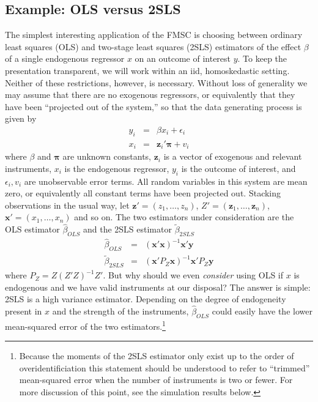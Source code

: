\documentclass[12pt]{article}
\theoremstyle{definition}
\begin{document}
\subsection{Example: OLS versus 2SLS}
\label{sec:OLSvsIVlowlevel}
The simplest interesting application of the FMSC is choosing between ordinary least squares (OLS) and two-stage least squares (2SLS) estimators of the effect $\beta$ of a single endogenous regressor $x$ on an outcome of interest $y$. 
To keep the presentation transparent, we will work within an iid, homoskedastic setting. 
Neither of these restrictions, however, is necessary. 
Without loss of generality we may assume that there are no exogenous regressors, or equivalently that they have been ``projected out of the system,'' so that the data generating process is given by
    \begin{eqnarray}
			y_{i} &=& \beta x_{i}  + \epsilon_{i}\\
	x_{i} &=& \mathbf{z}_{i}' \boldsymbol{\pi} + v_{i}
	\end{eqnarray}
where $\beta$ and $\boldsymbol{\pi}$ are unknown constants, $\mathbf{z}_i$ is a vector of exogenous and relevant instruments, $x_i$ is the endogenous regressor, $y_i$ is the outcome of interest, and $\epsilon_i, v_i$ are unobservable error terms. 
All random variables in this system are mean zero, or equivalently all constant terms have been projected out. 
Stacking observations in the usual way, let 
$\mathbf{z}' = (z_{1}, \hdots, z_{n})$, $Z' = (\mathbf{z}_{1}, \hdots, \mathbf{z}_{n})$, $\mathbf{x}' = (x_{1}, \hdots, x_{n})$ and so on. The two estimators under consideration are the OLS estimator $\widehat{\beta}_{OLS}$ and the 2SLS estimator $\widetilde{\beta}_{2SLS}$
  \begin{eqnarray} 
  \label{eq:OLS}
		\widehat{\beta}_{OLS} &=& \left(\mathbf{x}'\mathbf{x}\right)^{-1}\mathbf{x}'\mathbf{y}\\
	\label{eq:2SLS}
		\widetilde{\beta}_{2SLS} &=& \left(\mathbf{x}'P_Z\mathbf{x}\right)^{-1}\mathbf{x}'P_Z\mathbf{y}
	\end{eqnarray}
where $P_Z = Z(Z'Z)^{-1}Z'$. 
But why should we even \emph{consider} using OLS if $x$ is endogenous and we have valid instruments at our disposal? 
The answer is simple: 2SLS is a high variance estimator. 
Depending on the degree of endogeneity present in $x$ and the strength of the instruments, $\widehat{\beta}_{OLS}$ could easily have the lower mean-squared error of the two estimators.\footnote{Because the moments of the 2SLS estimator only exist up to the order of overidentificiation \citep{Phillips1980} this statement should be understood to refer to ``trimmed'' mean-squared error when the number of instruments is two or fewer. For more discussion of this point, see the simulation results below.} 
\end{document}
